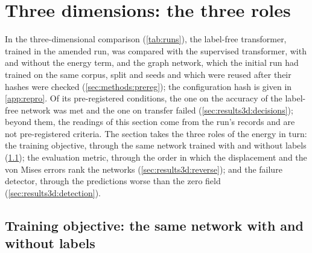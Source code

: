 \section{Three dimensions: the three roles}\label{sec:results3d}

In the three-dimensional comparison (\cref{tab:runs}), the label-free transformer, trained
in the amended run, was compared with the supervised transformer, with and without the
energy term, and the graph network, which the initial run had trained on the same corpus,
split and seeds and which were reused after their hashes were checked
(\cref{sec:methods:prereg}); the configuration hash is given in \ref{app:repro}. Of its
pre-registered conditions, the one on the accuracy of the label-free network was met and the
one on transfer failed (\cref{sec:results3d:decisions}); beyond them, the readings of this
section come from the run's records and are not pre-registered criteria. The section takes
the three roles of the energy in turn: the training objective, through the same network
trained with and without labels (\cref{sec:results3d:same}); the evaluation metric, through
the order in which the displacement and the von Mises errors rank the networks
(\cref{sec:results3d:reverse}); and the failure detector, through the predictions worse than
the zero field (\cref{sec:results3d:detection}).

\subsection{Training objective: the same network with and without labels}\label{sec:results3d:same}



